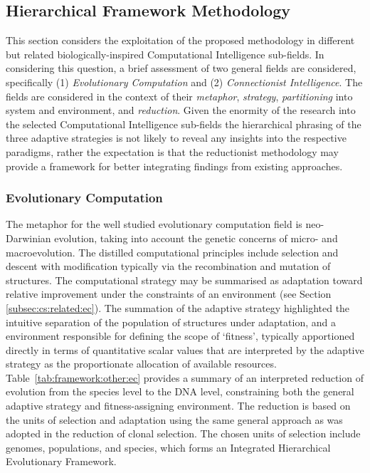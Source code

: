 %
%
\subsection{Hierarchical Framework Methodology}
\label{subsec:framework:ihcsf:applicability:other}
This section considers the exploitation of the proposed methodology in different but related biologically-inspired Computational Intelligence sub-fields. In considering this question, a brief assessment of two general fields are considered, specifically (1) \emph{Evolutionary Computation} and (2) \emph{Connectionist Intelligence}. The fields are considered in the context of their \emph{metaphor}, \emph{strategy}, \emph{partitioning} into system and environment, and \emph{reduction}. 
Given the enormity of the research into the selected Computational Intelligence sub-fields the hierarchical phrasing of the three adaptive strategies is not likely to reveal any insights into the respective paradigms, rather the expectation is that the reductionist methodology may provide a framework for better integrating findings from existing approaches. 


%
%
\subsubsection{Evolutionary Computation}
The metaphor for the well studied evolutionary computation field is neo-Darwinian evolution, taking into account the genetic concerns of micro- and macroevolution.
The distilled computational principles include selection and descent with modification typically via the recombination and mutation of structures. The computational strategy may be summarised as adaptation toward relative improvement under the constraints of an environment (see Section \ref{subsec:cs:related:ec}). 
The summation of the adaptive strategy highlighted the intuitive separation of the population of structures under adaptation, and a environment responsible for defining the scope of `fitness', typically apportioned directly in terms of quantitative scalar values that are interpreted by the adaptive strategy as the proportionate allocation of available resources.
Table~\ref{tab:framework:other:ec} provides a summary of an interpreted reduction of evolution from the species level to the DNA level, constraining both the general adaptive strategy and fitness-assigning environment.
The reduction is based on the units of selection and adaptation using the same general approach as was adopted in the reduction of clonal selection. The chosen units of selection include genomes, populations, and species, which forms an Integrated Hierarchical Evolutionary Framework. 

